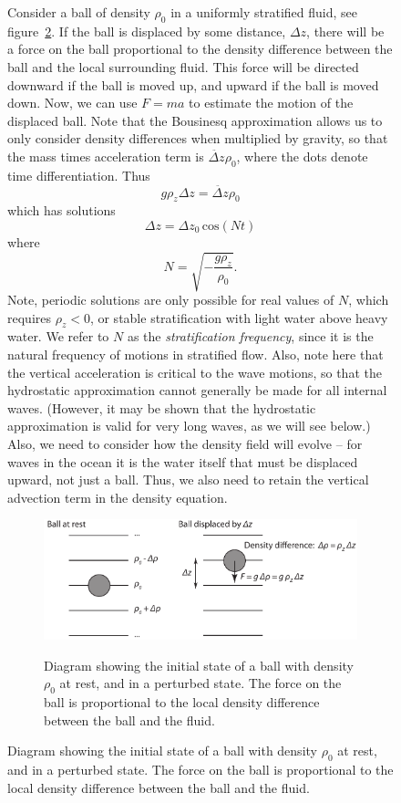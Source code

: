 \documentclass[11pt]{report}
\numberwithin{equation}{section}
\begin{document}
\begin{figure}
Consider a ball of density $\rho_0$ in a uniformly stratified fluid, see figure~\ref{fig:stratified_ball}.  If the ball is displaced by some distance, $\Delta z$, there will be a force on the ball proportional to the density difference between the ball and the local surrounding fluid.  This force will be directed downward if the ball is moved up, and upward if the ball is moved down.  Now, we can use $F=m a$ to estimate the motion of the displaced ball.  Note that the Bousinesq approximation allows us to only consider density differences when multiplied by gravity, so that the mass times acceleration term is $\ddot{\Delta z} \rho_0$, where the dots denote time differentiation.  Thus
\begin{equation}
    g \rho_z \Delta{}z = \ddot{\Delta z} \rho_0
\end{equation}
which has solutions
\begin{equation}
    \Delta{}z = \Delta{}z_0 \,\mathrm{cos}(N t)
\end{equation}
where
\begin{equation}
    N =  \sqrt{ - \frac{g \rho_z}{\rho_0}}.
\end{equation}
Note, periodic solutions are only possible for real values of $N$, which requires $\rho_z<0$, or stable stratification with light water above heavy water.  We refer to $N$ as the \emph{stratification frequency}, since it is the natural frequency of motions in stratified flow.  Also, note here that the vertical acceleration is critical to the wave motions, so that the hydrostatic approximation cannot generally be made for all internal waves.  (However, it may be shown that the hydrostatic approximation is valid for very long waves, as we will see below.) Also, we need to consider how the density field will evolve -- for waves in the ocean it is the water itself that must be displaced upward, not just a ball.  Thus, we also need to retain the vertical advection term in the density equation. 

\begin{figure}
    \centering
    \includegraphics[width=4in]{stratified_ball}
    \label{fig:stratified_ball}
    \caption{Diagram showing the initial state of a ball with density $\rho_0$ at rest, and in a perturbed state.  The force on the ball is proportional to the local density difference between the ball and the fluid.}
\end{figure}


\end{figure}
\end{document}
